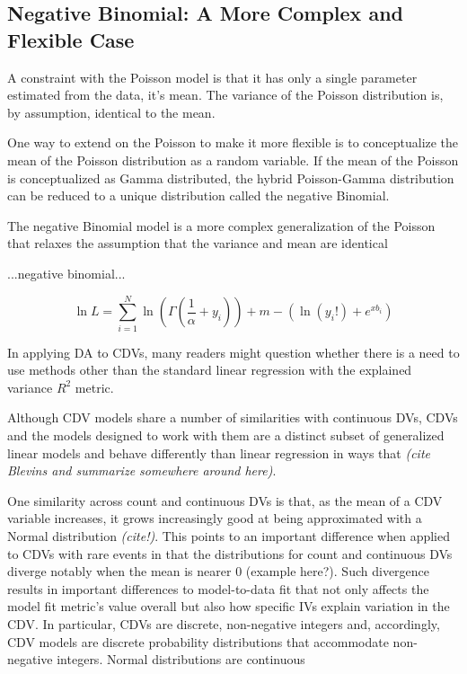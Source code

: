 \documentclass[ShortAfour,times,sageapa]{sagej}
\begin{document}
	\subsection{Negative Binomial: A More Complex and Flexible Case}
	
	A constraint with the Poisson model is that it has only a single parameter estimated from the data, it's mean.  The variance of the Poisson distribution is, by assumption, identical to the mean.
	
	One way to extend on the Poisson to make it more flexible is to conceptualize the mean of the Poisson distribution as a random variable.  If the mean of the Poisson is conceptualized as Gamma distributed, the hybrid Poisson-Gamma distribution can be reduced to a unique distribution called the negative Binomial.
	
	The negative Binomial model is a more complex generalization of the Poisson that relaxes the assumption that the variance and mean are identical
	
	...negative binomial...
	
	\begin{equation}
		\ln L = \sum_{i=1}^{N} \ln (\Gamma (\frac{1}{\alpha} + y_{i}) ) + m- (\ln (y_{i}!) + e^{xb_{i}})
	\end{equation}

	


	In applying DA to CDVs, many readers might question whether there is a need to use methods other than the standard linear regression with the explained variance $R^2$ metric.
	
	Although CDV models share a number of similarities with continuous DVs, CDVs and the models designed to work with them are a distinct subset of generalized linear models and behave differently than linear regression in ways that  \emph{(cite Blevins and summarize somewhere around here)}.
	
	One similarity across count and continuous DVs is that, as the mean of a CDV variable increases, it grows increasingly good at being approximated with a Normal distribution \emph{(cite!)}.  
	This points to an important difference when applied to CDVs with rare events in that the distributions for count and continuous DVs diverge notably when the mean is nearer 0 (example here?).  
	Such divergence results in important differences to model-to-data fit that not only affects the model fit metric's value overall but also how specific IVs explain variation in the CDV.  
	In particular, CDVs are discrete, non-negative integers and, accordingly, CDV models are discrete probability distributions that accommodate non-negative integers.  
	Normal distributions are continuous
	
\end{document}
